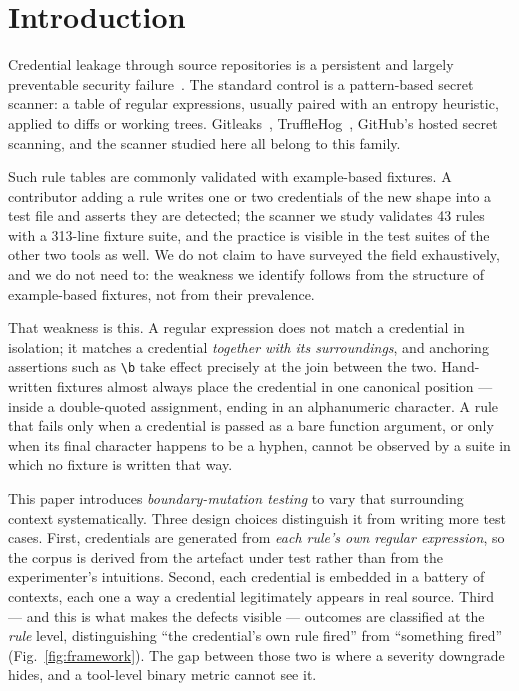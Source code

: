 \documentclass[pdflatex,sn-basic]{sn-jnl}
\begin{document}
\section{Introduction}

Credential leakage through source repositories is a persistent and largely preventable security failure~\citep{meli2019}. The standard control is a pattern-based secret scanner: a table of regular expressions, usually paired with an entropy heuristic, applied to diffs or working trees. Gitleaks~\citep{gitleaks}, TruffleHog~\citep{trufflehog}, GitHub's hosted secret scanning, and the scanner studied here all belong to this family.

Such rule tables are commonly validated with example-based fixtures. A contributor adding a rule writes one or two credentials of the new shape into a test file and asserts they are detected; the scanner we study validates 43 rules with a 313-line fixture suite, and the practice is visible in the test suites of the other two tools as well. We do not claim to have surveyed the field exhaustively, and we do not need to: the weakness we identify follows from the structure of example-based fixtures, not from their prevalence.

That weakness is this. A regular expression does not match a credential in isolation; it matches a credential \emph{together with its surroundings}, and anchoring assertions such as \verb|\b| take effect precisely at the join between the two. Hand-written fixtures almost always place the credential in one canonical position --- inside a double-quoted assignment, ending in an alphanumeric character. A rule that fails only when a credential is passed as a bare function argument, or only when its final character happens to be a hyphen, cannot be observed by a suite in which no fixture is written that way.

This paper introduces \emph{boundary-mutation testing} to vary that surrounding context systematically. Three design choices distinguish it from writing more test cases. First, credentials are generated from \emph{each rule's own regular expression}, so the corpus is derived from the artefact under test rather than from the experimenter's intuitions. Second, each credential is embedded in a battery of contexts, each one a way a credential legitimately appears in real source. Third --- and this is what makes the defects visible --- outcomes are classified at the \emph{rule} level, distinguishing ``the credential's own rule fired'' from ``something fired'' (Fig.~\ref{fig:framework}). The gap between those two is where a severity downgrade hides, and a tool-level binary metric cannot see it.
\end{document}
